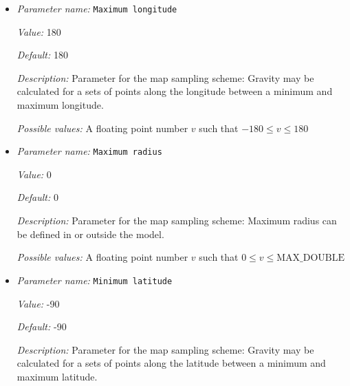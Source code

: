 \begin{itemize}
{\it Value:} 90


{\it Default:} 90


{\it Description:} Parameter for the map sampling scheme: Gravity may be calculated for a sets of points along the latitude between a minimum and maximum latitude.


{\it Possible values:} A floating point number $v$ such that $-90 \leq v \leq 90$
\item {\it Parameter name:} {\tt Maximum longitude}
\label{parameters:Postprocess/Gravity calculation/Maximum longitude}
\label{parameters:Postprocess/Gravity_20calculation/Maximum_20longitude}


{\it Value:} 180


{\it Default:} 180


{\it Description:} Parameter for the map sampling scheme: Gravity may be calculated for a sets of points along the longitude between a minimum and maximum longitude.


{\it Possible values:} A floating point number $v$ such that $-180 \leq v \leq 180$
\item {\it Parameter name:} {\tt Maximum radius}
\label{parameters:Postprocess/Gravity calculation/Maximum radius}
\label{parameters:Postprocess/Gravity_20calculation/Maximum_20radius}


{\it Value:} 0


{\it Default:} 0


{\it Description:} Parameter for the map sampling scheme: Maximum radius can be defined in or outside the model.


{\it Possible values:} A floating point number $v$ such that $0 \leq v \leq \text{MAX\_DOUBLE}$
\item {\it Parameter name:} {\tt Minimum latitude}
\label{parameters:Postprocess/Gravity calculation/Minimum latitude}
\label{parameters:Postprocess/Gravity_20calculation/Minimum_20latitude}


{\it Value:} -90


{\it Default:} -90


{\it Description:} Parameter for the map sampling scheme: Gravity may be calculated for a sets of points along the latitude between a minimum and maximum latitude.



\end{itemize}
